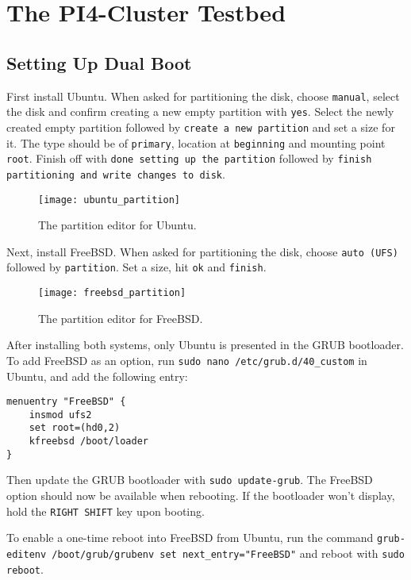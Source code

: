 \chapter{The PI4-Cluster Testbed}

\section{Setting Up Dual Boot}

First install Ubuntu. When asked for partitioning the disk, choose \lstinline{manual}, select the disk and confirm creating a new empty partition with \lstinline{yes}. Select the newly created empty partition followed by \lstinline{create a new partition} and set a size for it. The type should be of \lstinline{primary}, location at \lstinline{beginning} and mounting point \lstinline{root}. Finish off with \lstinline{done setting up the partition} followed by \lstinline{finish partitioning and write changes to disk}.

\begin{figure}[H]
    \centering
    \texttt{[image: ubuntu\_partition]}
    \captionsetup{width=0.75\linewidth}
    \caption{The partition editor for Ubuntu.}
    \label{fig:ubuntu_partition}
\end{figure}

Next, install FreeBSD. When asked for partitioning the disk, choose \lstinline{auto (UFS)} followed by \lstinline{partition}. Set a size, hit \lstinline{ok} and \lstinline{finish}.

\begin{figure}[H]
    \centering
    \texttt{[image: freebsd\_partition]}
    \captionsetup{width=0.75\linewidth}
    \caption{The partition editor for FreeBSD.}
    \label{fig:freebsd_partition}
\end{figure}

After installing both systems, only Ubuntu is presented in the GRUB bootloader. To add FreeBSD as an option, run \lstinline{sudo nano /etc/grub.d/40_custom} in Ubuntu, and add the following entry:

\begin{lstlisting}
menuentry "FreeBSD" {
    insmod ufs2
    set root=(hd0,2)
    kfreebsd /boot/loader
}
\end{lstlisting}

Then update the GRUB bootloader with \lstinline{sudo update-grub}. The FreeBSD option should now be available when rebooting. If the bootloader won't display, hold the \lstinline{RIGHT SHIFT} key upon booting.

To enable a one-time reboot into FreeBSD from Ubuntu, run the command \lstinline{grub-editenv /boot/grub/grubenv set next_entry="FreeBSD"} and reboot with \lstinline{sudo reboot}.